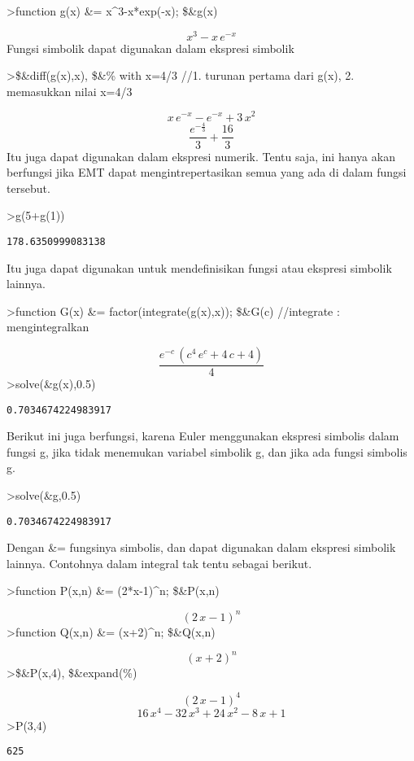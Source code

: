 \documentclass[
]{book}
\begin{document}
\textgreater function g(x) \&= x\^{}3-x*exp(-x); \$\&g(x)

\[x^3-x\,e^ {- x }\]Fungsi simbolik dapat digunakan dalam ekspresi simbolik

\textgreater\$\&diff(g(x),x), \$\&\% with x=4/3 //1. turunan pertama dari g(x), 2. memasukkan nilai x=4/3

\[x\,e^ {- x }-e^ {- x }+3\,x^2\]\[\frac{e^ {- \frac{4}{3} }}{3}+\frac{16}{3}\]Itu juga dapat digunakan dalam ekspresi numerik. Tentu saja, ini hanya akan berfungsi jika EMT dapat mengintrepertasikan semua yang ada di dalam fungsi tersebut.

\textgreater g(5+g(1))

\begin{verbatim}
178.6350999083138
\end{verbatim}

Itu juga dapat digunakan untuk mendefinisikan fungsi atau ekspresi simbolik lainnya.

\textgreater function G(x) \&= factor(integrate(g(x),x)); \$\&G(c) //integrate : mengintegralkan

\[\frac{e^ {- c }\,\left(c^4\,e^{c}+4\,c+4\right)}{4}\]\textgreater solve(\&g(x),0.5)

\begin{verbatim}
0.7034674224983917
\end{verbatim}

Berikut ini juga berfungsi, karena Euler menggunakan ekspresi simbolis dalam fungsi g, jika tidak menemukan variabel simbolik g, dan jika ada fungsi simbolis g.

\textgreater solve(\&g,0.5)

\begin{verbatim}
0.7034674224983917
\end{verbatim}

Dengan \&= fungsinya simbolis, dan dapat digunakan dalam ekspresi simbolik lainnya. Contohnya dalam integral tak tentu sebagai berikut.

\textgreater function P(x,n) \&= (2*x-1)\^{}n; \$\&P(x,n)

\[\left(2\,x-1\right)^{n}\]\textgreater function Q(x,n) \&= (x+2)\^{}n; \$\&Q(x,n)

\[\left(x+2\right)^{n}\]\textgreater\$\&P(x,4), \$\&expand(\%)

\[\left(2\,x-1\right)^4\]\[16\,x^4-32\,x^3+24\,x^2-8\,x+1\]\textgreater P(3,4)

\begin{verbatim}
625
\end{verbatim}
\end{document}
